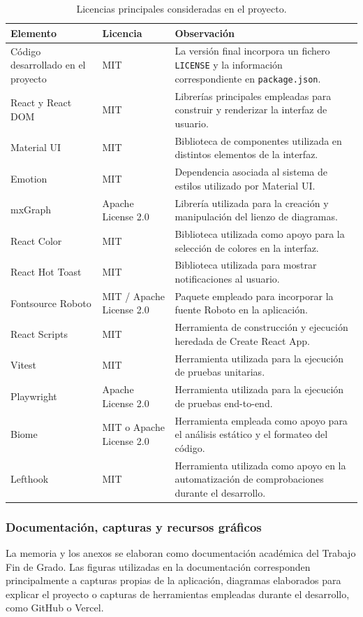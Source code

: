 \begin{table}[!htbp]
\centering
\small
\renewcommand{\arraystretch}{1.2}
\begin{tabular}{|p{}|p{}|p{}|}
\hline
\textbf{Elemento} & \textbf{Licencia} & \textbf{Observación} \tabularnewline
\hline
Código desarrollado en el proyecto & MIT & La versión final incorpora un fichero \texttt{LICENSE} y la información correspondiente en \texttt{package.json}. \tabularnewline
\hline
React y React DOM & MIT & Librerías principales empleadas para construir y renderizar la interfaz de usuario. \tabularnewline
\hline
Material UI & MIT & Biblioteca de componentes utilizada en distintos elementos de la interfaz. \tabularnewline
\hline
Emotion & MIT & Dependencia asociada al sistema de estilos utilizado por Material UI. \tabularnewline
\hline
mxGraph & Apache License 2.0 & Librería utilizada para la creación y manipulación del lienzo de diagramas. \tabularnewline
\hline
React Color & MIT & Biblioteca utilizada como apoyo para la selección de colores en la interfaz. \tabularnewline
\hline
React Hot Toast & MIT & Biblioteca utilizada para mostrar notificaciones al usuario. \tabularnewline
\hline
Fontsource Roboto & MIT / Apache License 2.0 & Paquete empleado para incorporar la fuente Roboto en la aplicación. \tabularnewline
\hline
React Scripts & MIT & Herramienta de construcción y ejecución heredada de Create React App. \tabularnewline
\hline
Vitest & MIT & Herramienta utilizada para la ejecución de pruebas unitarias. \tabularnewline
\hline
Playwright & Apache License 2.0 & Herramienta utilizada para la ejecución de pruebas end-to-end. \tabularnewline
\hline
Biome & MIT o Apache License 2.0 & Herramienta empleada como apoyo para el análisis estático y el formateo del código. \tabularnewline
\hline
Lefthook & MIT & Herramienta utilizada como apoyo en la automatización de comprobaciones durante el desarrollo. \tabularnewline
\hline
\end{tabular}
\caption{Licencias principales consideradas en el proyecto.}
\label{tab:licencias_proyecto}
\end{table}

\subsubsection{Documentación, capturas y recursos gráficos}

La memoria y los anexos se elaboran como documentación académica del Trabajo Fin de Grado. Las figuras utilizadas en la documentación corresponden principalmente a capturas propias de la aplicación, diagramas elaborados para explicar el proyecto o capturas de herramientas empleadas durante el desarrollo, como GitHub o Vercel.

